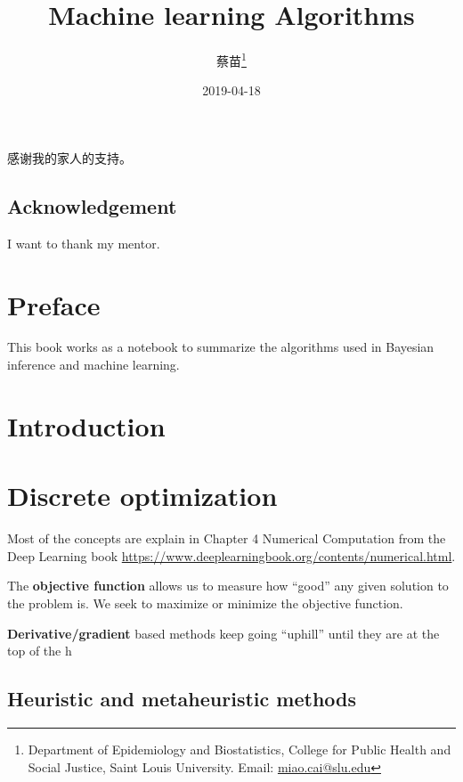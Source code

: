 \documentclass[fontset=fandol,zihao=false,scheme=chinese,heading=true,UTF8]{ctexbook}
\title{{\fontsize{26}{30}\selectfont \textbf{Machine learning Algorithms}}}
\author{蔡苗\footnote{Department of Epidemiology and Biostatistics, College for Public Health and Social Justice, Saint Louis University. Email: \url{miao.cai@slu.edu}}}
\date{2019-04-18}
\newenvironment{dedication}
{
   \cleardoublepage
   \thispagestyle{empty}
   \vspace*{\stretch{1}}
   \hfill\begin{minipage}[t]{0.66\textwidth}
   \raggedright
}
{
   \end{minipage}
   \vspace*{\stretch{3}}
   \clearpage
}
\begin{document}
\maketitle

\begin{dedication}
感谢我的家人的支持。
\end{dedication}

\section*{Acknowledgement}

I want to thank my mentor.

{
\setcounter{tocdepth}{2}
\tableofcontents
}
\listoftables
\listoffigures



\hypertarget{preface}{%
\chapter{Preface}\label{preface}}

This book works as a notebook to summarize the algorithms used in Bayesian inference and machine learning.

\mainmatter

\hypertarget{introduction}{%
\chapter{Introduction}\label{introduction}}

\hypertarget{discrete-optimization}{%
\chapter{Discrete optimization}\label{discrete-optimization}}

Most of the concepts are explain in Chapter 4 Numerical Computation from the Deep Learning book \url{https://www.deeplearningbook.org/contents/numerical.html}.

The \textbf{objective function} allows us to measure how ``good'' any given solution to the problem is.
We seek to maximize or minimize the objective function.

\textbf{Derivative/gradient} based methods keep going ``uphill'' until they are at the top of the h

\hypertarget{heuristic-and-metaheuristic-methods}{%
\section{Heuristic and metaheuristic methods}\label{heuristic-and-metaheuristic-methods}}
\end{document}
